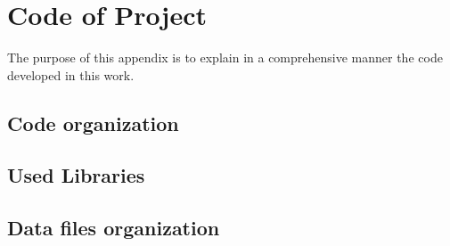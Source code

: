 \chapter{Code of Project}
\label{chapter:appendixA}


The purpose of this appendix is to explain in a comprehensive manner the code developed in this work. 


\section{Code organization}

\section{Used Libraries}

\section{Data files organization}